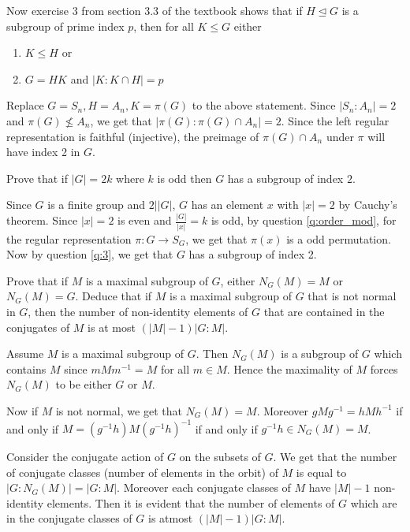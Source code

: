 \documentclass[12pt]{exam}
\theoremstyle{plain} %
\theoremstyle{definition} %
\theoremstyle{remark} %
\begin{document}
\begin{questions}
\begin{solution}
    Now exercise 3 from section 3.3 of the textbook shows that if $H
    \trianglelefteq G$ is a subgroup of prime index $p$, then for all
    $K \leqslant G$ either
    \begin{enumerate}[label=(\arabic*)]
      \item $K \leqslant H$ or
      \item $G = HK$ and $|K : K \cap H| = p$
    \end{enumerate}

    Replace $G = S_n, H = A_n, K = \pi(G)$ to the above
    statement. Since $|S_n : A_n| = 2$ and  $\pi(G) \nleqslant A_n$,
    we get that $|\pi(G): \pi(G) \cap A_n| = 2$. Since the left
    regular representation is faithful (injective), the preimage of
    $\pi(G) \cap A_n$ under $\pi$ will have index 2 in $G$.

  \end{solution}

  \question
  Prove that if $|G| = 2k$ where $k$ is odd then $G$ has a subgroup
  of index $2$.
  \begin{solution}
    Since $ G$ is a finite group and $2\big||G|$, $G$ has an element
    $x$ with $|x| = 2$ by Cauchy's theorem. Since $|x| = 2$ is even
    and $\frac{|G|}{|x|} = k$ is odd, by question \ref{q:order_mod}, for
    the regular representation $\pi: G \to S_G$, we get that $\pi(x)$
    is a odd permutation. Now by question \ref{q:3}, we get that $G$
    has a subgroup of index 2.

  \end{solution}

  \question
  Prove that if $M$ is a maximal subgroup of $G$, either $N_G(M) = M$
  or $N_G(M) = G$. Deduce that if $M$ is a maximal subgroup of $G$
  that is not normal in $G$, then the number of non-identity elements
  of $G$ that are contained in the conjugates of $M$ is at most $(|M|
  - 1)|G:M|$.
  \begin{solution}
    Assume $M$ is a maximal subgroup of $G$. Then $N_G(M)$ is a
    subgroup of $G$ which contains $M$ since $mMm^{-1} = M$ for all
    $m \in M$. Hence the maximality of $M$ forces $N_G(M)$ to be
    either $G$ or $M$.

    Now if $M$ is not normal, we get that $N_G(M) = M$. Moreover
    $gMg^{-1} = hMh^{-1}$ if and only if $M =
    (g^{-1}h)M(g^{-1}h)^{-1}$ if and only if $g^{-1}h \in N_G(M) = M$.

    Consider the conjugate action of $G$ on the subsets of $G$. We
    get that the number of conjugate classes (number of elements in
    the orbit) of $M$ is equal to $|G:N_G(M)| = |G:M|$. Moreover each
    conjugate classes of $M$ have $|M|-1$ non-identity elements. Then
    it is evident that the number of elements of $G$ which are in the
    conjugate classes of $G$ is atmost $(|M|-{1})|G:M|$.
  \end{solution}


\end{questions}
\end{document}
